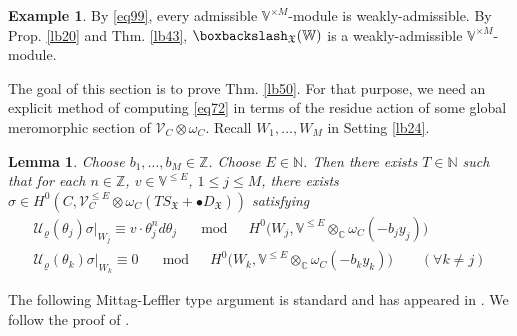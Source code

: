 \documentclass[11pt,b5paper,notitlepage]{article}
\theoremstyle{definition}
\newtheorem{eg}[df]{Example}
\theoremstyle{plain}
\newtheorem{lm}[df]{Lemma}
\newcommand{\fk}{\mathfrak}
\newcommand{\mc}{\mathcal}
\newcommand{\scr}{\mathscr}
\newcommand{\SX}{{S_{\fk X}}}
\newcommand{\DX}{D_{\fk X}}
\newcommand{\blt}{\bullet}
\newcommand{\Vbb}{\mathbb V}
\newcommand{\Wbb}{\mathbb W}
\newcommand{\Cbb}{\mathbb C}
\newcommand{\Nbb}{\mathbb N}
\newcommand{\Zbb}{\mathbb Z}
\newcommand{\<}{\left\langle}
\renewcommand{\>}{\right\rangle}
\newcommand{\fx}{\mathfrak{X}}
\newcommand{\bbs}{\boxbackslash}
\numberwithin{equation}{subsection}
\begin{document}
\begin{eg}
By \eqref{eq99}, every admissible $\Vbb^{\times M}$-module is weakly-admissible. By Prop. \ref{lb20} and Thm. \ref{lb43}, $\bbs_\fx(\Wbb)$ is a weakly-admissible $\Vbb^{\times M}$-module.
\end{eg}


The goal of this section is to prove Thm. \ref{lb50}. For that purpose, we need an explicit method of computing \eqref{eq72} in terms of the residue action of some global meromorphic section of $\scr V_C\otimes\omega_C$. Recall $W_1,\dots,W_M$ in Setting \ref{lb24}.



\begin{lm}\label{lb51}
Choose $b_1,\dots,b_M\in\Zbb$. Choose $E\in\Nbb$. Then there exists $T\in\Nbb$ such that for each $n\in\Zbb$, $v\in\Vbb^{\leq E}$, $1\leq j\leq M$,  there exists $\sigma\in H^0(C,\scr V_C^{\leq E}\otimes\omega_C(T\SX+\blt\DX))$   satisfying 
\begin{subequations}\label{eq122}
\begin{gather}
\mc U_\varrho(\theta_j)\sigma\big|_{W_j}\equiv v\cdot  \theta_j^nd\theta_j\quad\mod\quad H^0\big(W_j,\Vbb^{\leq E}\otimes_\Cbb\omega_C(-b_jy_j)\big) \\
\mc U_\varrho(\theta_k)\sigma\big |_{W_k}\equiv 0\quad\mod\quad H^0\big(W_k,\Vbb^{\leq E}\otimes_\Cbb\omega_C(-b_ky_k)\big)\qquad(\forall k\neq j)
\end{gather}
\end{subequations}
\end{lm}

The following Mittag-Leffler type argument is standard and has appeared in \cite{AN03-finite-dimensional,KZ-conformal-block,DGT2}. We follow the proof of \cite[Thm. 12.1]{Gui-sewingconvergence}.
\end{document}
